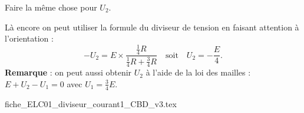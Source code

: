 
\begin{enonce}
Faire la même chose pour $U_2$.
\end{enonce}


\begin{corrige}
	Là encore on peut utiliser la formule du diviseur de tension en faisant attention à l'orientation : 
	\[
		-U_2=E\times\frac{\frac14 R}{\frac14 R+\frac34 R}
		\quad\text{soit}\quad
		U_2=-\frac{E}{4}.
	\]
	\textbf{Remarque} : on peut aussi obtenir $U_2$ à l'aide de la loi des mailles : $E+U_2-U_1=0$ avec $U_1=\frac34 E$.
\end{corrige}


\finEntrainement





\hauteurLargeurCadreReponse		{7mm}{15mm}
\typeEntrainement				{} %
\initialisationEntrainement

\begin{center}
{fiche_ELC01_diviseur_courant1_CBD_v3.tex}
\end{center}

\debutEntrainement


